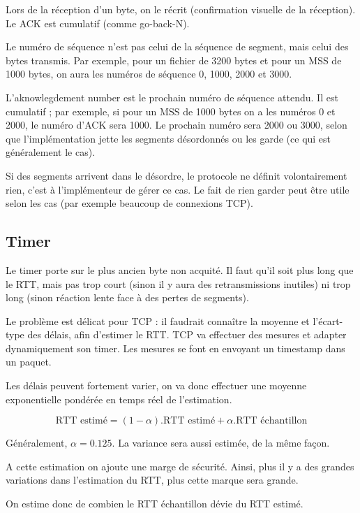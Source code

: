 	 
	
	Lors de la réception d'un byte, on le récrit (confirmation visuelle de
la réception). Le ACK est cumulatif (comme go-back-N).
	
	Le numéro de séquence n'est pas celui de la séquence de segment, mais celui des bytes transmis. Par exemple, pour un fichier de 3200 bytes et pour un MSS de 1000 bytes, on aura les numéros de séquence 0, 1000, 2000 et 3000.
	
	L'aknowlegdement number est le prochain numéro de séquence attendu. Il est cumulatif ; par exemple, si pour un MSS de 1000 bytes on a les numéros 0 et 2000, le numéro d'ACK sera 1000. Le prochain numéro sera 2000 ou 3000, selon que l'implémentation jette les segments désordonnés ou les garde (ce qui est généralement le cas).
	
	
	Si des segments arrivent dans le désordre, le protocole ne définit volontairement rien, c'est à l'implémenteur de gérer ce cas. Le fait de rien garder peut être utile selon les cas (par exemple beaucoup de connexions TCP).

	\subsection{Timer}
	
	Le timer porte sur le plus ancien byte non acquité. Il faut qu'il soit plus long que le RTT, mais pas trop court (sinon il y aura des retransmissions inutiles) ni trop long (sinon réaction lente face à des pertes de segments).

	Le problème est délicat pour TCP : il faudrait connaître la moyenne et l'écart-type des délais, afin d'estimer le RTT. TCP va effectuer des mesures et adapter dynamiquement son timer. Les mesures se font en envoyant un timestamp dans un paquet.

	Les délais peuvent fortement varier, on va donc effectuer une moyenne exponentielle pondérée en temps réel de l'estimation.
	
	$$\text{RTT estimé} =  (1 - \alpha ) . \text{RTT estimé} + \alpha . \text{RTT échantillon}$$

	Généralement, $\alpha = 0.125$. La variance sera aussi estimée, de la même façon.

	A cette estimation on ajoute une marge de sécurité. Ainsi, plus il y a des grandes variations dans l'estimation du RTT, plus cette marque sera grande.
	
	On estime donc de combien le RTT échantillon dévie du RTT estimé.
	
